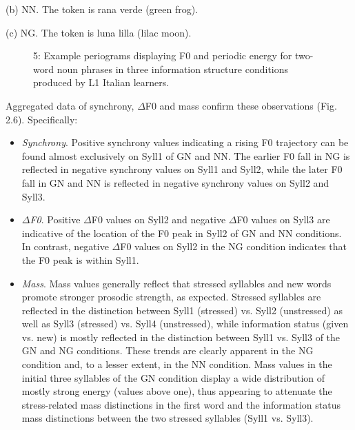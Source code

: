 \begin{stylecaption}
 (b) NN. The token is rana verde (green frog).
\end{stylecaption}

\begin{stylecaption}
  
 
\end{stylecaption}

\begin{stylecaption}
(c) NG. The token is luna lilla (lilac moon).
\end{stylecaption}

\begin{stylecaption}\begin{figure}
\caption{5: Example periograms displaying F0 and periodic energy for two-word noun phrases in three information structure conditions produced by L1 Italian learners.} 
\label{fig:key:2}
\end{figure}\end{stylecaption}

Aggregated data of synchrony, ${\Delta}$F0 and mass confirm these observations (Fig. 2.6). Specifically:

\begin{itemize}
\item \textit{Synchrony}. Positive synchrony values indicating a rising F0 trajectory can be found almost exclusively on Syll1 of GN and NN. The earlier F0 fall in NG is reflected in negative synchrony values on Syll1 and Syll2, while the later F0 fall in GN and NN is reflected in negative synchrony values on Syll2 and Syll3.
\item \textit{${\Delta}$F0}. Positive ${\Delta}$F0 values on Syll2 and negative ${\Delta}$F0 values on Syll3 are indicative of the location of the F0 peak in Syll2 of GN and NN conditions. In contrast, negative ${\Delta}$F0 values on Syll2 in the NG condition indicates that the F0 peak is within Syll1.
\item \textit{Mass}. Mass values generally reflect that stressed syllables and new words promote stronger prosodic strength, as expected. Stressed syllables are reflected in the distinction between Syll1 (stressed) vs. Syll2 (unstressed) as well as Syll3 (stressed) vs. Syll4 (unstressed), while information status (given vs. new) is mostly reflected in the distinction between Syll1 vs. Syll3 of the GN and NG conditions. These trends are clearly apparent in the NG condition and, to a lesser extent, in the NN condition. Mass values in the initial three syllables of the GN condition display a wide distribution of mostly strong energy (values above one), thus appearing to attenuate the stress-related mass distinctions in the first word and the information status mass distinctions between the two stressed syllables (Syll1 vs. Syll3).
\end{itemize}

